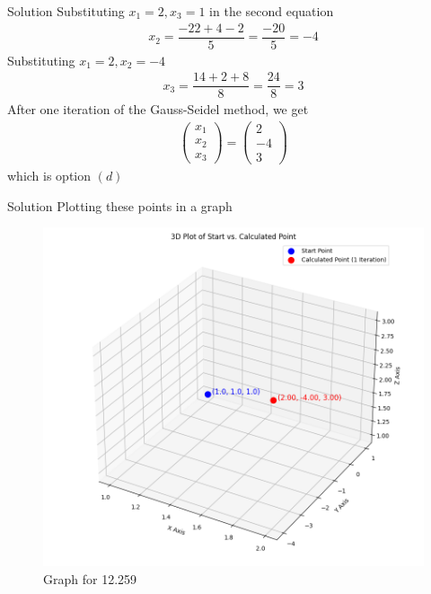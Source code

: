 \documentclass{beamer}
\providecommand{\brak}[1]{\ensuremath{\left(#1\right)}}
\theoremstyle{remark}
\newcommand{\myvec}[1]{\ensuremath{\begin{pmatrix}#1\end{pmatrix}}}
\begin{document}
\begin{frame}{Solution}
Substituting $x_1=2 , x_3=1$ in the second equation
\begin{align}
    x_2=\dfrac{-22+4 -2}{5} = \dfrac{-20}{5} =-4
\end{align}
Substituting $x_1=2, x_2 = -4$
\begin{align}
    x_3=\dfrac{14+2+8}{8}=\dfrac{24}{8}=3
\end{align}
After one iteration of the Gauss-Seidel method, we get
\begin{align}
    \myvec{x_1 \\ x_2 \\ x_3 }=\myvec{2 \\ -4 \\ 3}
\end{align}
which is option $\brak{d}$
\end{frame}
\begin{frame}{Solution}
    Plotting these points in a graph
\begin{figure}
    \centering
    \includegraphics[width=0.5\columnwidth]{figs/1.png}
    \caption{Graph for 12.259}
    \label{fig:placeholder}
\end{figure}
\end{frame}
\end{document}
